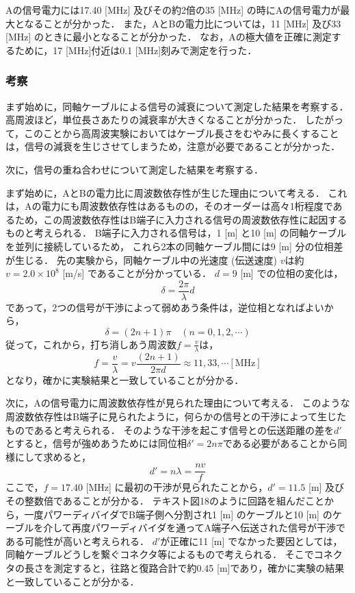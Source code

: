 \documentclass[uplatex,dvipdfmx,a4j,12pt]{jsarticle}
\begin{document}
Aの信号電力には17.40 [MHz] 及びその約2倍の35 [MHz] の時にAの信号電力が最大となることが分かった．
また，AとBの電力比については，11 [MHz] 及び33 [MHz] のときに最小となることが分かった．
なお，Aの極大値を正確に測定するために，17 [MHz]付近は0.1 [MHz]刻みで測定を行った．


\subsubsection{考察}
まず始めに，同軸ケーブルによる信号の減衰について測定した結果を考察する．
高周波ほど，単位長さあたりの減衰率が大きくなることが分かった．
したがって，このことから高周波実験においてはケーブル長さをむやみに長くすることは，信号の減衰を生じさせてしまうため，注意が必要であることが分かった．

次に，信号の重ね合わせについて測定した結果を考察する．

まず始めに，AとBの電力比に周波数依存性が生じた理由について考える．
これは，Aの電力にも周波数依存性はあるものの，そのオーダーは高々1桁程度であるため，この周波数依存性はB端子に入力される信号の周波数依存性に起因するものと考えられる．
B端子に入力される信号は，1 [m] と10 [m] の同軸ケーブルを並列に接続しているため， これら2本の同軸ケーブル間には9 [m] 分の位相差が生じる．
先の実験から，同軸ケーブル中の光速度 (伝送速度) $v$は約$v = 2.0 \times 10^8$ [m/s] であることが分かっている．
$d = 9$ [m] での位相の変化は，
\begin{equation}
  \delta = \frac{2\pi}{\lambda}d
\end{equation}
であって，2つの信号が干渉によって弱めあう条件は，逆位相となればよいから，
\begin{equation}
  \delta = (2n + 1)\pi \quad (n = 0, 1, 2, \cdots)
\end{equation}
従って，これから，打ち消しあう周波数$f = \frac{v}{\lambda}$は，
\begin{equation}
  f = \frac{v}{\lambda} = v \frac{(2n + 1)}{2\pi d} \approx 11, 33, \cdots \mathrm{[MHz]}
\end{equation}
となり，確かに実験結果と一致していることが分かる．

次に，Aの信号電力に周波数依存性が見られた理由について考える．
このような周波数依存性はB端子に見られたように，何らかの信号との干渉によって生じたものであると考えられる．
そのような干渉を起こす信号との伝送距離の差を$d'$とすると，信号が強めあうためには同位相$\delta' = 2n\pi$である必要があることから同様にして求めると，
\begin{equation}
  d' = n\lambda = \frac{n v}{f}
\end{equation}
ここで，$f = 17.40$ [MHz] に最初の干渉が見られたことから，$d' = 11.5$ [m] 及びその整数倍であることが分かる．
テキスト図18のように回路を組んだことから，一度パワーディバイダでB端子側へ分割され1 [m] のケーブルと10 [m] のケーブルを介して再度パワーディバイダを通ってA端子へ伝送された信号が干渉である可能性が高いと考えられる．
$d'$が正確に11 [m] でなかった要因としては，同軸ケーブルどうしを繋ぐコネクタ等によるもので考えられる．
そこでコネクタの長さを測定すると，往路と復路合計で約0.45 [m]であり，確かに実験の結果と一致していることが分かる．
\end{document}

